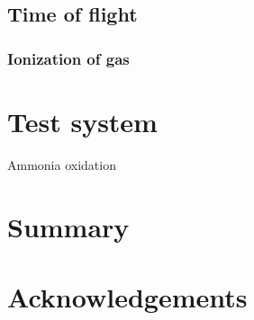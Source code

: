 \documentclass[12pt]{article}
\begin{document}
\subsection{Time of flight}

\subsubsection{Ionization of gas}

\section{Test system}
Ammonia oxidation

\section{Summary}

\section{Acknowledgements}
\end{document}
